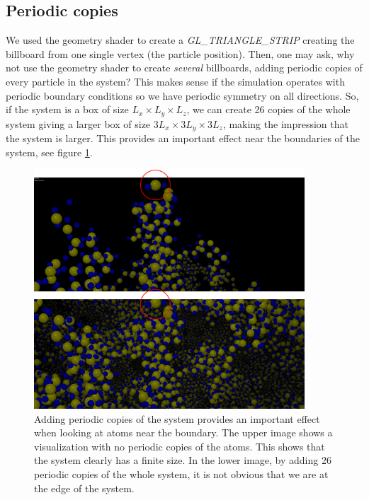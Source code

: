 \subsection{Periodic copies}
We used the geometry shader to create a \textit{GL\_TRIANGLE\_STRIP} creating the billboard from one single vertex (the particle position). Then, one may ask, why not use the geometry shader to create \textit{several} billboards, adding periodic copies of every particle in the system? This makes sense if the simulation operates with periodic boundary conditions so we have periodic symmetry on all directions. So, if the system is a box of size $L_x\times L_y \times L_z$, we can create 26 copies of the whole system giving a larger box of size $3L_x\times 3L_y\times 3L_z$, making the impression that the system is larger. This provides an important effect near the boundaries of the system, see figure \ref{fig:visualization_billboard_periodic_copies}.
\begin{figure}[htb]
\begin{center}
\includegraphics[width=0.9\textwidth, trim=0cm 0cm 0cm 0cm, clip]{visualization/figures/periodic_copies.png}
\end{center}
\caption{Adding periodic copies of the system provides an important effect when looking at atoms near the boundary. The upper image shows a visualization with no periodic copies of the atoms. This shows that the system clearly has a finite size. In the lower image, by adding 26 periodic copies of the whole system, it is not obvious that we are at the edge of the system.}
\label{fig:visualization_billboard_periodic_copies}
\end{figure}
